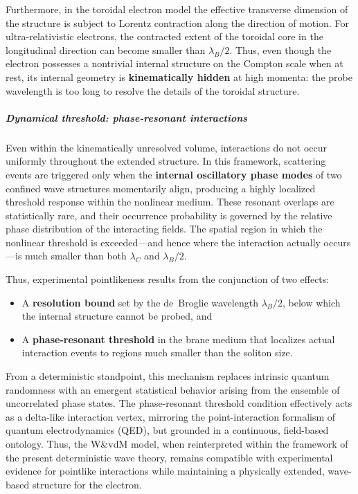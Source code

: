 Furthermore, in the toroidal electron model the effective transverse dimension of the structure
is subject to Lorentz contraction along the direction of motion. For ultra-relativistic electrons,
the contracted extent of the toroidal core in the longitudinal direction can become smaller than
$\lambda_B/2$. Thus, even though the electron possesses a nontrivial internal structure on the
Compton scale when at rest, its internal geometry is \textbf{kinematically hidden} at high momenta:
the probe wavelength is too long to resolve the details of the toroidal structure.

\subparagraph{Dynamical threshold: phase-resonant interactions}

Even within the kinematically unresolved volume, interactions do not occur uniformly throughout
the extended structure. In this framework, scattering events are triggered only when the
\textbf{internal oscillatory phase modes} of two confined wave structures momentarily align,
producing a highly localized threshold response within the nonlinear medium. These resonant overlaps
are statistically rare, and their occurrence probability is governed by the relative phase distribution
of the interacting fields. The spatial region in which the nonlinear threshold is exceeded---and hence
where the interaction actually occurs---is much smaller than both $\lambda_C$ and $\lambda_B/2$.

Thus, experimental pointlikeness results from the conjunction of two effects:
\begin{itemize}
\tightlist
\item
  A \textbf{resolution bound} set by the de~Broglie wavelength $\lambda_B/2$, below which the
  internal structure cannot be probed, and
\item
  A \textbf{phase-resonant threshold} in the brane medium that localizes actual interaction
  events to regions much smaller than the soliton size.
\end{itemize}

From a deterministic standpoint, this mechanism replaces intrinsic quantum randomness
with an emergent statistical behavior arising from the ensemble of uncorrelated phase states.
The phase-resonant threshold condition effectively acts as a delta-like interaction vertex,
mirroring the point-interaction formalism of quantum electrodynamics (QED),
but grounded in a continuous, field-based ontology.
Thus, the W\&vdM model, when reinterpreted within the framework of the present deterministic wave theory,
remains compatible with experimental evidence for pointlike interactions
while maintaining a physically extended, wave-based structure for the electron.


